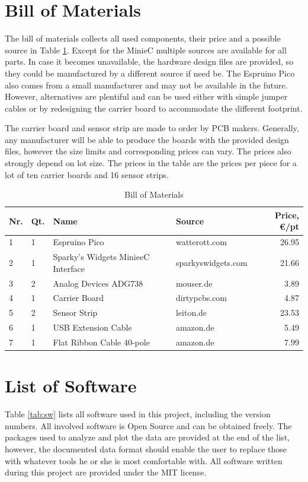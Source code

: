 \section{Bill of Materials} \label{BOM}

The bill of materials collects all used components, their price and a possible source in Table \ref{tab:bom}. Except for the MinieC multiple sources are available for all parts. In case it becomes unavailable, the hardware design files are provided, so they could be manufactured by a different source if need be. The Espruino Pico also comes from a small manufacturer and may not be available in the future. However, alternatives are plentiful and can be used either with simple jumper cables or by redesigning the carrier board to accommodate the different footprint.

The carrier board and sensor strip are made to order by PCB makers. Generally, any manufacturer will be able to produce the boards with the provided design files, however the size limits and corresponding prices can vary. The prices also strongly depend on lot size. The prices in the table are the prices per piece for a lot of ten carrier boards and 16 sensor strips.

\begin{table}[H]
    \centering

    \caption[Bill of Materials]{Bill of Materials}
    \label{tab:bom}
    \begin{tabular}{llllr}
        	\toprule
        	Nr. & Qt. & Name & Source & Price, \euro{}/pt  \tabularnewline
        	\midrule
		1 & 1 & Espruino Pico & watterott.com & 26.95 \tabularnewline
		2 & 1 & Sparky's Widgets MinieeC Interface & sparkyswidgets.com & 21.66 \tabularnewline
		3 & 2 & Analog Devices ADG738 & mouser.de & 3.89 \tabularnewline
		4 & 1 & Carrier Board & dirtypcbs.com & 4.87 \tabularnewline
		5 & 2 & Sensor Strip & leiton.de & 23.53 \tabularnewline
		6 & 1 & USB Extension Cable & amazon.de & 5.49 \tabularnewline
		7 & 1 &  Flat Ribbon Cable 40-pole & amazon.de & 7.99 \tabularnewline
        \bottomrule
    \end{tabular}
\end{table}

\section{List of Software}

Table \ref{tab:sw} lists all software used in this project, including the version numbers. All involved software is Open Source and can be obtained freely. The packages used to analyze and plot the data are provided at the end of the list, however, the documented data format should enable the user to replace those with whatever tools he or she is most comfortable with. All software written during this project are provided under the MIT license.


